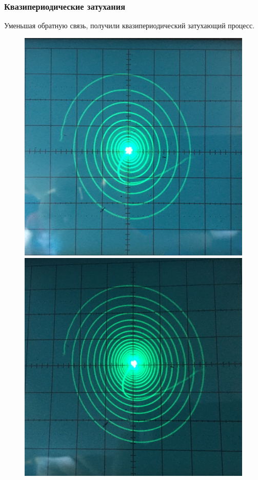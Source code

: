 \subsubsection{Квазипериодические затухания}
Уменьшая обратную связь, получили квазипериодический затухающий процесс.
\begin{figure}[h]
	\centering
	\begin{minipage}{0.32\linewidth}
	\includegraphics[width=\linewidth]{photo/task1c1.jpg}
	\end{minipage}
	\begin{minipage}{0.32\linewidth}
	\includegraphics[width=\linewidth]{photo/task1c5.jpg}

\end{minipage}
\end{figure}

